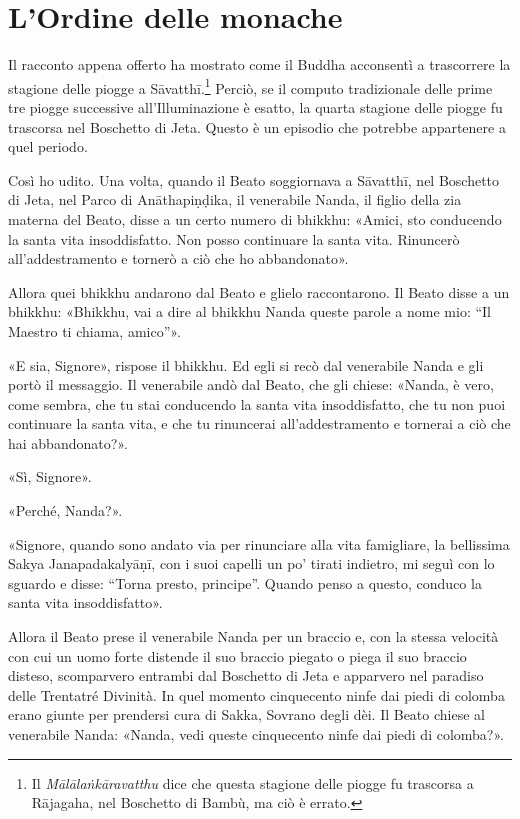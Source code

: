 \chapter{L'Ordine delle monache}

 Il racconto appena offerto ha mostrato come il Buddha
acconsentì a trascorrere la stagione delle piogge a
Sāvatthī.\footnote{Il \emph{Mālālaṅkāravatthu} dice che questa stagione delle piogge fu trascorsa a Rājagaha, nel Boschetto di Bambù, ma ciò è errato.} Perciò,
se il computo tradizionale delle
prime tre piogge successive all’Illuminazione è esatto, la quarta
stagione delle piogge fu trascorsa nel Boschetto di Jeta. Questo è un
episodio che potrebbe appartenere a quel periodo.


 Così ho udito. Una volta, quando il Beato soggiornava a
Sāvatthī, nel Boschetto di Jeta, nel Parco di Anāthapiṇḍika, il
venerabile Nanda, il figlio della zia materna del Beato, disse a un
certo numero di bhikkhu: «Amici, sto conducendo la santa vita
insoddisfatto. Non posso continuare la santa vita. Rinuncerò
all’addestramento e tornerò a ciò che ho abbandonato».


Allora quei bhikkhu andarono dal Beato e glielo raccontarono. Il Beato
disse a un bhikkhu: «Bhikkhu, vai a dire al bhikkhu Nanda queste parole
a nome mio: “Il Maestro ti chiama, amico”».


«E sia, Signore», rispose il bhikkhu. Ed egli si recò dal venerabile
Nanda e gli portò il messaggio. Il venerabile andò dal Beato, che gli
chiese: «Nanda, è vero, come sembra, che tu stai conducendo la santa
vita insoddisfatto, che tu non puoi continuare la santa vita, e che tu
rinuncerai all’addestramento e tornerai a ciò che hai abbandonato?».


«Sì, Signore».


«Perché, Nanda?».


«Signore, quando sono andato via per rinunciare alla vita famigliare, la
bellissima Sakya Janapadakalyāṇī, con i suoi capelli un po’ tirati
indietro, mi seguì con lo sguardo e disse: “Torna presto, principe”.
Quando penso a questo, conduco la santa vita insoddisfatto».


Allora il Beato prese il venerabile Nanda per un braccio e, con la
stessa velocità con cui un uomo forte distende il suo braccio piegato o
piega il suo braccio disteso, scomparvero entrambi dal Boschetto di Jeta
e apparvero nel paradiso delle Trentatré Divinità. In quel momento
cinquecento ninfe dai piedi di colomba erano giunte per prendersi cura
di Sakka, Sovrano degli dèi. Il Beato chiese al venerabile Nanda:
«Nanda, vedi queste cinquecento ninfe dai piedi di colomba?».



